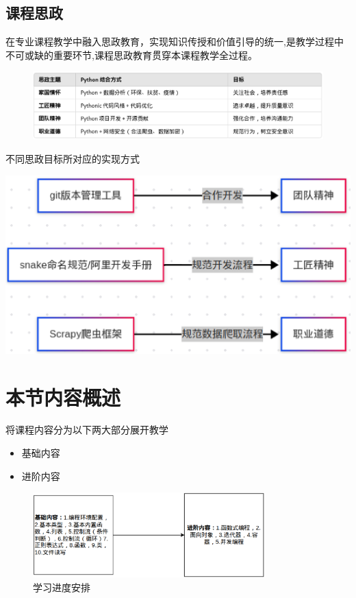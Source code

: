 \documentclass{beamer}
\begin{document}
\subsection{课程思政}

\begin{frame}[t]
	在专业课程教学中融入思政教育，实现知识传授和价值引导的统一,是教学过程中不可或缺的重要环节,课程思政教育贯穿本课程教学全过程。
	\begin{figure}[htbp]
		\begin{center}
			\includegraphics[width=0.9\linewidth]{policy.eps}
		\end{center}
	\end{figure}
	\pause
	不同思政目标所对应的实现方式
	\begin{center}
		\includegraphics[width=0.5\linewidth]{tools_for_policy.eps}
	\end{center}
\end{frame}


\section{本节内容概述}

\begin{frame}[t]
	将课程内容分为以下两大部分展开教学
	
	\begin{itemize}
		\item 基础内容
		\item 进阶内容
	\end{itemize}
	\begin{figure}
	\begin{center}
		\includegraphics[width=0.8\textwidth]{study_content.eps}
	\end{center}
	\caption{学习进度安排}

	\end{figure}
	
\end{frame}
\end{document}
